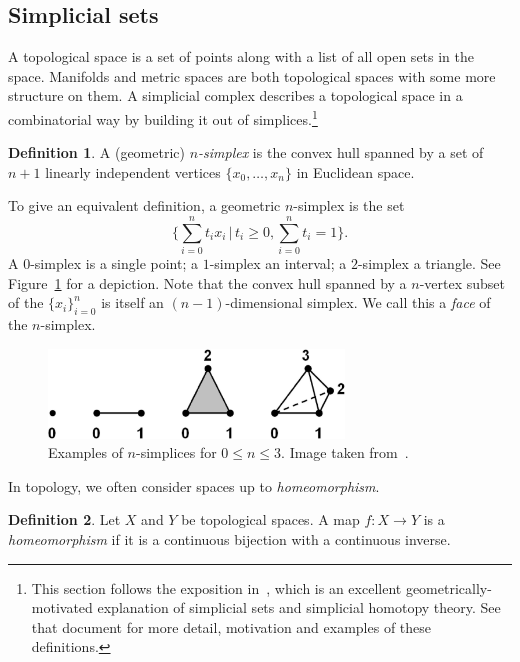\documentclass[a4paper,11pt,leqno]{article} \usepackage{amsmath}
\theoremstyle{definition}
\newtheorem{defn}{Definition}
\begin{document}
\subsection{Simplicial sets}

A topological space is a set of points along with a list of all open sets in
the space.
Manifolds and metric spaces are both topological spaces with some more
structure on them.
A simplicial complex describes a topological space in a combinatorial
way by building it out of simplices.\footnote{
  This section follows the exposition in~\cite{Friedman08}, which is an
  excellent geometrically-motivated explanation of simplicial sets and
  simplicial homotopy theory.
  See that document for more detail, motivation and examples of these
  definitions.
}

\begin{defn}
A (geometric) \emph{$n$-simplex} is the convex hull spanned by a set of $n+1$
linearly independent vertices $\{x_0,\dots, x_n\}$ in Euclidean space.
\end{defn}

To give an equivalent definition, a geometric $n$-simplex is the set
$$\{\sum_{i=0}^n t_ix_i\,|\, t_i\geq 0, \sum_{i=0}^n t_i = 1\}.$$
A $0$-simplex is a single point; a $1$-simplex an interval; a $2$-simplex
a triangle.
See Figure~\ref{fig_simplices} for a depiction.
Note that the convex hull spanned by a $n$-vertex subset of the
$\{x_i\}_{i=0}^n$ is itself an $(n-1)$-dimensional simplex.
We call this a \emph{face} of the $n$-simplex.

\begin{figure} \centering
  \includegraphics[width=0.7\textwidth]{figures/simp2.jpg} \caption{Examples of
  $n$-simplices for $0\leq n\leq 3$.
  Image taken from~\cite{Friedman08}.}
\label{fig_simplices} \end{figure}

In topology, we often consider spaces up to \emph{homeomorphism}.
\begin{defn}
  Let $X$ and $Y$ be topological spaces.
  A map $f: X\to Y$ is a \emph{homeomorphism} if it is a continuous bijection
  with a continuous inverse.
\end{defn}
\end{document}
